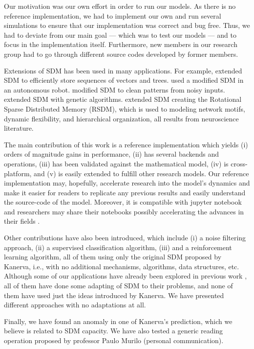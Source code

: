 Our motivation was our own effort in order to run our models. As there is no reference implementation, we had to implement our own and run several simulations to ensure that our implementation was correct and bug free. Thus, we had to deviate from our main goal --- which was to test our models --- and to focus in the implementation itself. Furthermore, new members in our research group had to go through different source codes developed by former members.

Extensions of SDM has been used in many applications. For example, \citet{Snaider2011} extended SDM to efficiently store sequences of vectors and trees.  \citet{Rajesh1998} used a modified SDM in an autonomous robot. \citet{Meng2009} modified SDM to clean patterns from noisy inputs. \citet{fan1997genetic} extended SDM with genetic algorithms. \citet{chada2016you} extended SDM creating the Rotational Sparse Distributed Memory (RSDM), which is used to modeling network motifs, dynamic flexibility, and hierarchical organization, all results from neuroscience literature.

The main contribution of this work is a reference implementation which yields (i) orders of magnitude gains in performance, (ii) has several backends and operations, (iii) has been validated against the mathematical model, (iv) is cross-platform, and (v) is easily extended to fulfill other research models. Our reference implementation may, hopefully, accelerate research into the model's dynamics and make it easier for readers to replicate any previous results and easily understand the source-code of the model.  Moreover, it is compatible with jupyter notebook and researchers may share their notebooks possibly accelerating the advances in their fields \citep{shen2014interactive}.

Other contributions have also been introduced, which include (i) a noise filtering approach, (ii) a supervised classification algorithm, (iii) and a reinforcement learning algorithm, all of them using only the original SDM proposed by Kanerva, i.e., with no additional mechanisms, algorithms, data structures, etc. Although some of our applications have already been explored in previous work \citep{Meng2009, fan1997genetic, rao1995natural}, all of them have done some adapting of SDM to their problems, and none of them have used just the ideas introduced by Kanerva. We have presented different approaches with no adaptations at all.

Finally, we have found an anomaly in one of Kanerva's prediction, which we believe is related to SDM capacity. We have also tested a generic reading operation proposed by professor Paulo Murilo (personal communication).

